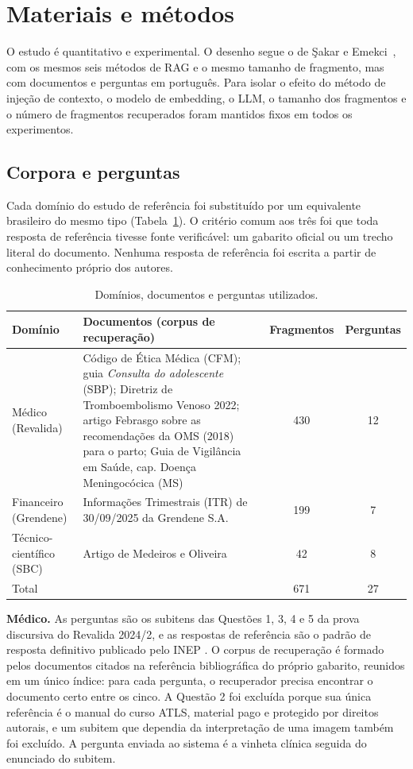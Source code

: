 \section{Materiais e métodos}
\label{sc:metodos}

O estudo é quantitativo e experimental. O desenho segue o de Şakar e Emekci~\cite{sakar2025rag}, com os mesmos seis métodos de RAG e o mesmo tamanho de fragmento, mas com documentos e perguntas em português. Para isolar o efeito do método de injeção de contexto, o modelo de embedding, o LLM, o tamanho dos fragmentos e o número de fragmentos recuperados foram mantidos fixos em todos os experimentos.

\subsection{Corpora e perguntas}

Cada domínio do estudo de referência foi substituído por um equivalente brasileiro do mesmo tipo (Tabela~\ref{tab:corpora}). O critério comum aos três foi que toda resposta de referência tivesse fonte verificável: um gabarito oficial ou um trecho literal do documento. Nenhuma resposta de referência foi escrita a partir de conhecimento próprio dos autores.

\begin{table}[htbp]
\centering
\small
\caption{Domínios, documentos e perguntas utilizados.}
\label{tab:corpora}
\begin{tabular}{p{2.4cm}p{6.2cm}cc}
\toprule
Domínio & Documentos (corpus de recuperação) & Fragmentos & Perguntas \\
\midrule
Médico (Revalida) & Código de Ética Médica (CFM); guia \emph{Consulta do adolescente} (SBP); Diretriz de Tromboembolismo Venoso 2022; artigo Febrasgo sobre as recomendações da OMS (2018) para o parto; Guia de Vigilância em Saúde, cap. Doença Meningocócica (MS) & 430 & 12 \\
Financeiro (Grendene) & Informações Trimestrais (ITR) de 30/09/2025 da Grendene S.A. \cite{grendene2025itr} & 199 & 7 \\
Técnico-científico (SBC) & Artigo de Medeiros e Oliveira~\cite{medeiros2025embeddings} & 42 & 8 \\
\midrule
Total & & 671 & 27 \\
\bottomrule
\end{tabular}
\end{table}

\textbf{Médico.} As perguntas são os subitens das Questões 1, 3, 4 e 5 da prova discursiva do Revalida 2024/2, e as respostas de referência são o padrão de resposta definitivo publicado pelo INEP \cite{inep2024revalida}. O corpus de recuperação é formado pelos documentos citados na referência bibliográfica do próprio gabarito, reunidos em um único índice: para cada pergunta, o recuperador precisa encontrar o documento certo entre os cinco. A Questão 2 foi excluída porque sua única referência é o manual do curso ATLS, material pago e protegido por direitos autorais, e um subitem que dependia da interpretação de uma imagem também foi excluído. A pergunta enviada ao sistema é a vinheta clínica seguida do enunciado do subitem.

